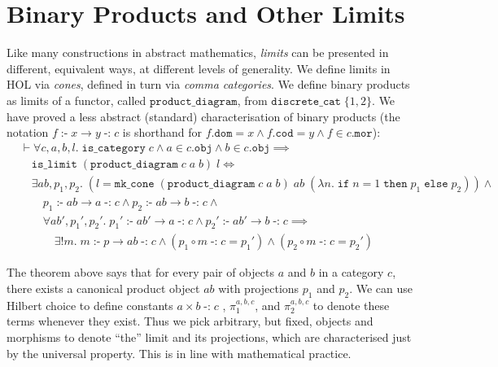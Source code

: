 \documentclass[twoside,titlepage,11pt]{article}
\begin{document}
\section{Binary Products and Other Limits}%
\label{limits}
Like many constructions in abstract mathematics, \emph{limits} can be presented in different, equivalent ways, at different levels of generality.
We define limits in HOL via \emph{cones}, defined in turn via \emph{comma categories}.
We define binary products as limits of a functor, called $\mathtt{product\_diagram}$, from $\mathtt{discrete\_cat}\;\{1,2\}$.
We have proved a less abstract (standard) characterisation of binary products (the notation $f\operatorname{\mathtt{:-}}x\to y\operatorname{\mathtt{-:}}c$ is shorthand for $f.\mathtt{dom}=x\land f.\mathtt{cod}=y\land f\in c.\mathtt{mor}$):
\begin{align*}
&\vdash\forall{c,a,b,l}.\;\mathtt{is\_category}\;c\land a\in c.\mathtt{obj}\land b \in c.\mathtt{obj}\implies\\
&\quad\mathtt{is\_limit}\;(\mathtt{product\_diagram}\;c\;a\;b)\;l\iff\\
&\quad\exists{ab,p_1,p_2}.\;(l = \mathtt{mk\_cone}\;(\mathtt{product\_diagram}\;c\;a\;b)\;ab\;(\lambda{n}.\; \mathtt{if}\;n = 1\;\mathtt{then}\;p_1\;\mathtt{else}\;p_2))\land{}\\
&\quad\quad p_1\operatorname{\mathtt{:-}}ab \to a\operatorname{\mathtt{-:}}c\land p_2\operatorname{\mathtt{:-}}ab \to b\operatorname{\mathtt{-:}}c\land{}\\
&\quad\quad\forall{ab',p_1',p_2'}.\;
p_1'\operatorname{\mathtt{:-}} ab' \to a \operatorname{\mathtt{-:}}c\land
p_2'\operatorname{\mathtt{:-}} ab' \to b \operatorname{\mathtt{-:}}c\implies\\
&\quad\quad\quad\exists!{m}.\;
m\operatorname{\mathtt{:-}}p\to ab\operatorname{\mathtt{-:}}c\land(p_1\circ m\operatorname{\mathtt{-:}}c = p_1')\land(p_2\circ m\operatorname{\mathtt{-:}}c = p_2')
\end{align*}

The theorem above says that for every pair of objects $a$ and $b$ in a category $c$, there exists a canonical product object $ab$ with projections $p_1$ and $p_2$.
We can use Hilbert choice to define constants $a\times b\operatorname{\mathtt{-:}}c$ , $\pi_1^{a,b,c}$, and $\pi_2^{a,b,c}$ to denote these terms whenever they exist.
Thus we pick arbitrary, but fixed, objects and morphisms to denote ``the'' limit and its projections, which are characterised just by the universal property.
This is in line with mathematical practice.
\end{document}
